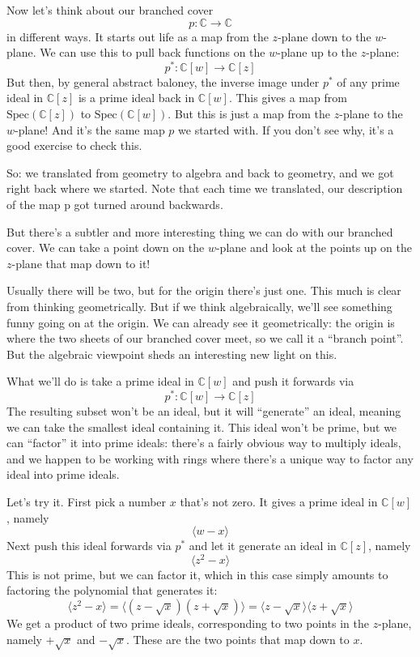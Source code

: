\documentclass{article}
\begin{document}
Now let's think about our branched cover
\[p\colon \mathbb{C} \to \mathbb{C}\] in different ways. It starts out
life as a map from the \(z\)-plane down to the \(w\)-plane. We can use
this to pull back functions on the \(w\)-plane up to the \(z\)-plane:
\[p^*\colon \mathbb{C}[w] \to \mathbb{C}[z]\] But then, by general
abstract baloney, the inverse image under \(p^*\) of any prime ideal in
\(\mathbb{C}[z]\) is a prime ideal back in \(\mathbb{C}[w]\). This gives
a map from \(\mathrm{Spec}(\mathbb{C}[z])\) to
\(\mathrm{Spec}(\mathbb{C}[w])\). But this is just a map from the
\(z\)-plane to the \(w\)-plane! And it's the same map \(p\) we started
with. If you don't see why, it's a good exercise to check this.

So: we translated from geometry to algebra and back to geometry, and we
got right back where we started. Note that each time we translated, our
description of the map p got turned around backwards.

But there's a subtler and more interesting thing we can do with our
branched cover. We can take a point down on the \(w\)-plane and look at
the points up on the \(z\)-plane that map down to it!

Usually there will be two, but for the origin there's just one. This
much is clear from thinking geometrically. But if we think
algebraically, we'll see something funny going on at the origin. We can
already see it geometrically: the origin is where the two sheets of our
branched cover meet, so we call it a ``branch point''. But the algebraic
viewpoint sheds an interesting new light on this.

What we'll do is take a prime ideal in \(\mathbb{C}[w]\) and push it
forwards via \[p^*\colon \mathbb{C}[w] \to \mathbb{C}[z]\] The resulting
subset won't be an ideal, but it will ``generate'' an ideal, meaning we
can take the smallest ideal containing it. This ideal won't be prime,
but we can ``factor'' it into prime ideals: there's a fairly obvious way
to multiply ideals, and we happen to be working with rings where there's
a unique way to factor any ideal into prime ideals.

Let's try it. First pick a number \(x\) that's not zero. It gives a
prime ideal in \(\mathbb{C}[w]\), namely \[\langle w - x\rangle\] Next
push this ideal forwards via \(p^*\) and let it generate an ideal in
\(\mathbb{C}[z]\), namely \[\langle z^2 - x\rangle\] This is not prime,
but we can factor it, which in this case simply amounts to factoring the
polynomial that generates it:
\[\langle z^2-x\rangle = \langle (z-\sqrt{x})(z+\sqrt{x})\rangle = \langle z-\sqrt{x}\rangle\langle z+\sqrt{x}\rangle\]
We get a product of two prime ideals, corresponding to two points in the
\(z\)-plane, namely \(+\sqrt{x}\) and \(-\sqrt{x}\). These are the two
points that map down to \(x\).
\end{document}
